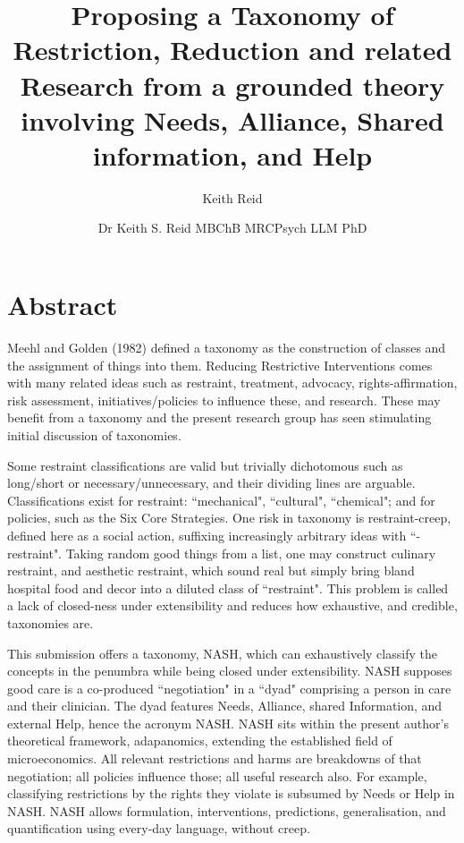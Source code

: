 \documentclass[10pt,a4paper]{article}
\author{Keith Reid}
\begin{document}
\title{Proposing a Taxonomy of Restriction, Reduction and related Research from a grounded theory involving Needs, Alliance, Shared information, and Help}
\author{Dr Keith S. Reid MBChB MRCPsych LLM PhD}
\maketitle
\section{Abstract}

Meehl and Golden (1982) defined a taxonomy as the construction of classes and the assignment of things into them. 
Reducing Restrictive Interventions comes with many related ideas such as restraint, treatment, advocacy, rights-affirmation, risk assessment, initiatives/policies to influence these, and research.
These may benefit from a taxonomy and the present research group has seen stimulating initial discussion of taxonomies.

Some restraint classifications are valid but trivially dichotomous such as long/short or necessary/unnecessary, and their dividing lines are arguable.
Classifications exist for restraint: ``mechanical", ``cultural", ``chemical"; and for policies, such as the Six Core Strategies.
One risk in taxonomy is restraint-creep, defined here as a social action, suffixing increasingly arbitrary ideas with ``-restraint".
Taking random good things from a list, one may construct culinary restraint, and aesthetic restraint, which sound real but simply bring bland hospital food and decor into a diluted class of ``restraint".
This problem is called a lack of closed-ness under extensibility and reduces how exhaustive, and credible, taxonomies are.

This submission offers a taxonomy, NASH, which can exhaustively classify the concepts in the penumbra while being closed under extensibility.
NASH supposes good care is a co-produced ``negotiation" in a ``dyad" comprising a person in care and their clinician.
The dyad features Needs, Alliance, shared Information, and external Help, hence the acronym NASH.
NASH sits within the present author's theoretical framework, adapanomics, extending the established field of microeconomics.
All relevant restrictions and harms are breakdowns of that negotiation; all policies influence those; all useful research also.
For example, classifying restrictions by the rights they violate is subsumed by Needs or Help in NASH.
NASH allows formulation, interventions, predictions, generalisation, and quantification using every-day language, without creep.
\end{document}
